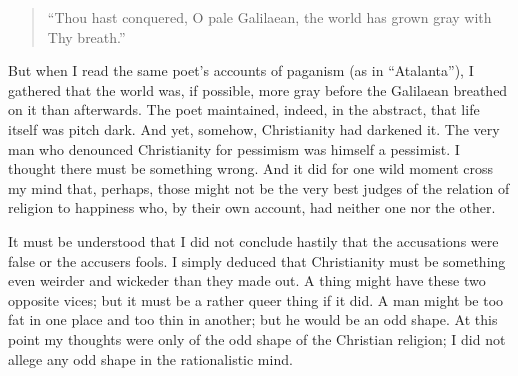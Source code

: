 \documentclass{book}
\newenvironment{mdblockquote}{%
  \begin{quotation}
    \itshape
}{%
  \end{quotation}
}
\begin{document}
\begin{mdblockquote}
“Thou hast conquered, O pale Galilaean, the world has grown gray with Thy breath.”


\end{mdblockquote}
But when I read the same poet’s accounts of paganism (as in “Atalanta”), I gathered that the world was, if possible, more gray before the Galilaean breathed on it than afterwards. The poet maintained, indeed, in the abstract, that life itself was pitch dark. And yet, somehow, Christianity had darkened it. The very man who denounced Christianity for pessimism was himself a pessimist. I thought there must be something wrong. And it did for one wild moment cross my mind that, perhaps, those might not be the very best judges of the relation of religion to happiness who, by their own account, had neither one nor the other.

It must be understood that I did not conclude hastily that the accusations were false or the accusers fools. I simply deduced that Christianity must be something even weirder and wickeder than they made out. A thing might have these two opposite vices; but it must be a rather queer thing if it did. A man might be too fat in one place and too thin in another; but he would be an odd shape. At this point my thoughts were only of the odd shape of the Christian religion; I did not allege any odd shape in the rationalistic mind.
\end{document}
